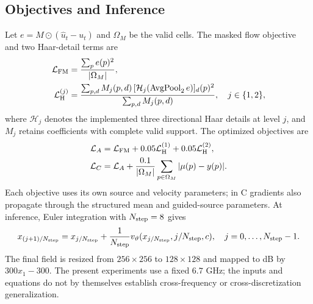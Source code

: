 \subsection{Objectives and Inference}
Let $e=M\odot(\widehat u_t-u_t)$ and $\Omega_M$ be the valid cells. The
masked flow objective and two Haar-detail terms are
\begin{align}
 \mathcal L_{\rm FM}&=\frac{\sum_p e(p)^2}{|\Omega_M|},\\
 \mathcal L_{\rm H}^{(j)}&=
 \frac{\sum_{p,d} M_j(p,d)\,[\mathcal H_j(\operatorname{AvgPool}_2 e)]_d(p)^2}
 {\sum_{p,d}M_j(p,d)},\quad j\in\{1,2\},
 \label{eq:ac-objectives}
\end{align}
where $\mathcal H_j$ denotes the implemented three directional Haar details at
level $j$, and $M_j$ retains coefficients with complete valid support.
The optimized objectives are
\begin{align}
 \mathcal L_A&=\mathcal L_{\rm FM}+0.05\mathcal L_{\rm H}^{(1)}
 +0.05\mathcal L_{\rm H}^{(2)},\\
 \mathcal L_C&=\mathcal L_A+\frac{0.1}{|\Omega_M|}
 \sum_{p\in\Omega_M}|\mu(p)-y(p)|.
 \label{eq:ac-loss}
\end{align}
Each objective uses its own source and velocity parameters; in C gradients
also propagate through the structured mean and guided-source parameters.
At inference, Euler integration with $N_{\rm step}=8$ gives
\begin{equation}
 x_{(j+1)/N_{\rm step}}=x_{j/N_{\rm step}}+
 \frac{1}{N_{\rm step}}v_{\vartheta}(x_{j/N_{\rm step}},j/N_{\rm step},c),
 \quad j=0,\ldots,N_{\rm step}-1.
\end{equation}
The final field is resized from $256\times256$ to $128\times128$ and mapped
to dB by $300x_1-300$. The present experiments use a fixed $6.7$ GHz;
the inputs and equations do not by themselves establish cross-frequency or
cross-discretization generalization.
